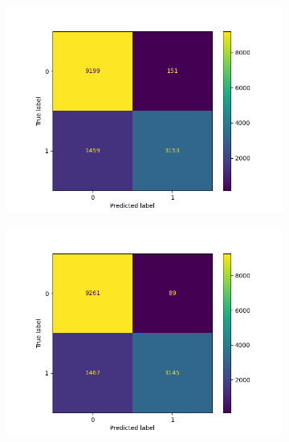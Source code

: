 \begin{figure}
\begin{subfigure}[b]{0.245\textwidth}
            \centering 
            \includegraphics[scale=0.35]{"../figs/fig_content_title/fig_ngramKNN_3k=3_content_title.png"}
            \caption{}
        \end{subfigure}
        \begin{subfigure}[b]{0.245\textwidth}
            \centering
            \includegraphics[scale=0.35]{"../figs/fig_content_title/fig_ngramKNN_3k=5_content_title.png"}
            \caption{}
        \end{subfigure}
        \begin{subfigure}[b]{0.245\textwidth}  
            \centering 

\end{subfigure}
\end{figure}
